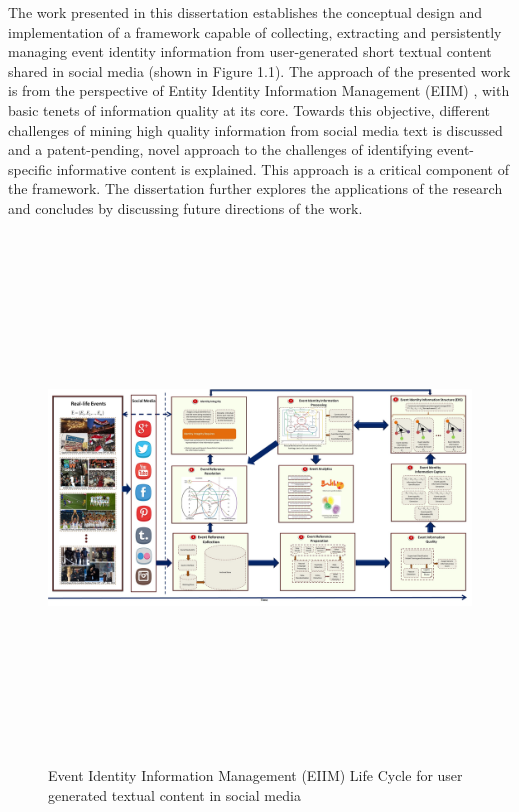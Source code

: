 \indent The work presented in this dissertation establishes the conceptual design and implementation of a framework capable of collecting, extracting and persistently managing event identity information from user-generated short textual content shared in social media (shown in Figure 1.1). The approach of the presented work is from the perspective of Entity Identity Information Management (EIIM) \cite{zhou2011entity}, with basic tenets of information quality at its core. Towards this objective, different challenges of mining high quality information from social media text is discussed and a patent-pending, novel approach to the challenges of identifying event-specific informative content is explained. This approach is a critical component of the framework. The dissertation further explores the applications of the research and concludes by discussing future directions of the work.



\begin{figure}
\label{eiim}
  \caption{Event Identity Information Management (EIIM) Life Cycle for user generated textual content in social media}
    \includegraphics[width=24cm,height=14cm]{Figures/NewEIIM.jpg}
\end{figure}

